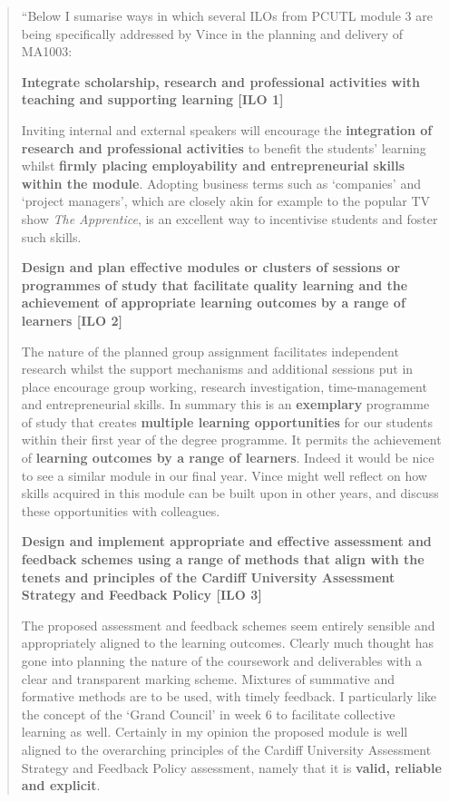\documentclass{article}
\begin{document}
\begin{quote}
``Below I sumarise ways in which several ILOs from PCUTL module 3 are being specifically addressed by Vince in the planning and delivery of MA1003:

\textbf {Integrate scholarship, research and professional activities with teaching and supporting learning [ILO 1]}

Inviting internal and external speakers will encourage the \textbf{integration of research and professional activities} to benefit the students' learning whilst \textbf{firmly placing employability and entrepreneurial skills within the module}. Adopting business terms such as `companies' and `project managers', which are closely akin for example to the popular TV show \emph {The Apprentice}, is an excellent way to incentivise students and foster such skills.

\textbf {Design and plan effective modules or clusters of sessions or programmes of study that facilitate quality learning and the achievement of appropriate learning outcomes by a range of learners [ILO 2]}

The nature of the planned group assignment facilitates independent research whilst the support mechanisms and additional sessions put in place encourage group working, research investigation, time-management and entrepreneurial skills.  In summary this is an \textbf{exemplary} programme of study that creates \textbf{multiple learning opportunities} for our students within their first year of the degree programme.  It permits the achievement of \textbf{learning outcomes by a range of learners}.  Indeed it would be nice to see a similar module in our final year.  Vince might well reflect on how skills acquired in this module can be built upon in other years, and discuss these opportunities with colleagues.

\textbf {Design and implement appropriate and effective assessment and feedback schemes using a range of methods that align with the tenets and principles of the Cardiff University Assessment Strategy and Feedback Policy [ILO 3]}

The proposed assessment and feedback schemes seem entirely sensible and appropriately aligned to the learning outcomes.  Clearly much thought has gone into planning the nature of the coursework and deliverables with a clear and transparent marking scheme.  Mixtures of summative and formative methods are to be used, with timely feedback.  I particularly like the concept of the ‘Grand Council’ in week 6 to facilitate collective learning as well.  Certainly in my opinion the proposed module is well aligned to the overarching principles of the Cardiff University Assessment Strategy and Feedback Policy assessment, namely that it is \textbf{valid, reliable and explicit}.


\end{quote}
\end{document}
